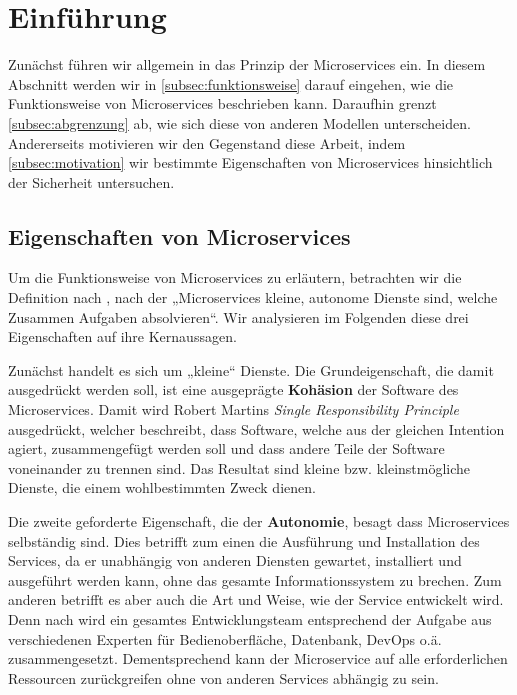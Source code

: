 \section{Einführung}
\label{sec:einführung}

Zunächst führen wir allgemein in das Prinzip der Microservices ein. In diesem Abschnitt werden wir in \autoref{subsec:funktionsweise} darauf eingehen, wie die Funktionsweise von Microservices beschrieben kann. Daraufhin grenzt \autoref{subsec:abgrenzung} ab, wie sich diese von anderen Modellen unterscheiden. Andererseits motivieren wir den Gegenstand diese Arbeit, indem \autoref{subsec:motivation} wir bestimmte Eigenschaften von Microservices hinsichtlich der Sicherheit untersuchen.

\subsection{Eigenschaften von Microservices}
\label{subsec:funktionsweise}

Um die Funktionsweise von Microservices zu erläutern, betrachten wir die Definition nach \cite{newman2015}, nach der „Microservices kleine, autonome Dienste sind, welche Zusammen Aufgaben absolvieren“. Wir analysieren im Folgenden diese drei Eigenschaften auf ihre Kernaussagen.

Zunächst handelt es sich um „kleine“ Dienste. Die Grundeigenschaft, die damit ausgedrückt werden soll, ist eine ausgeprägte \textbf{Kohäsion} der Software des Microservices. Damit wird Robert Martins \textit{Single Responsibility Principle} ausgedrückt, welcher beschreibt, dass Software, welche aus der gleichen Intention agiert, zusammengefügt werden soll und dass andere Teile der Software voneinander zu trennen sind. Das Resultat sind kleine bzw. kleinstmögliche Dienste, die einem wohlbestimmten Zweck dienen.

Die zweite geforderte Eigenschaft, die der \textbf{Autonomie}, besagt dass Microservices selbständig sind. Dies betrifft zum einen die Ausführung und Installation des Services, da er unabhängig von anderen Diensten gewartet, installiert und ausgeführt werden kann, ohne das gesamte Informationssystem zu brechen. Zum anderen betrifft es aber auch die Art und Weise, wie der Service entwickelt wird. Denn nach \cite{Fowler+14} wird ein gesamtes Entwicklungsteam entsprechend der Aufgabe aus verschiedenen Experten für Bedienoberfläche, Datenbank, DevOps o.ä. zusammengesetzt. Dementsprechend kann der Microservice auf alle erforderlichen Ressourcen zurückgreifen ohne von anderen Services abhängig zu sein.

